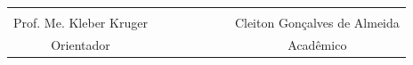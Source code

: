 \documentclass[a4paper,12pt,brazil]{ufms-cpcx}
\begin{document}
\vskip 10cm
\begin{table}[!h]
	\renewcommand{\arraystretch}{1.3}
	\centering
	\begin{tabular}{cccccccc}
		 & & & & & & & \\
		Prof. Me. Kleber Kruger & & & & & & & Cleiton Gonçalves de Almeida \\
		Orientador & & & & & & & Acadêmico \\
	\end{tabular}
\end{table}


\cleardoublepage
{} 

% 

%
\end{document}

